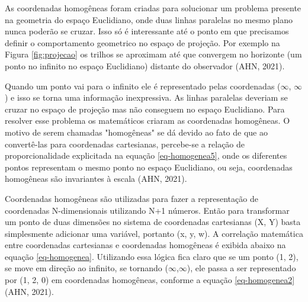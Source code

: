 \label{ap:coordenadas-homogeneas}

As coordenadas homogêneas foram criadas para solucionar um problema presente na geometria do espaço Euclidiano, onde duas linhas paralelas no mesmo plano nunca poderão se cruzar. Isso só é interessante até o ponto em que precisamos definir o comportamento geometrico no espaço de projeção. Por exemplo na Figura \ref{fig:projecao} os trilhos se aproximam até que convergem no horizonte (um ponto no infinito no espaço Euclidiano) distante do observador (AHN, 2021)\nocite{homogenous}.

	\begin{figure}[h!]
		\centering
	\end{figure}

Quando um ponto vai para o infinito ele é representado pelas coordenadas ($\infty$, $\infty$) e isso se torna uma informação inexpressiva. As linhas paralelas deveriam se cruzar no espaço de projeção mas não conseguem no espaço Euclidiano. Para resolver esse problema os matemáticos criaram as coordenadas homogêneas. O motivo de serem chamadas "homogêneas" se dá devido ao fato de que ao convertê-las para coordenadas cartesianas, percebe-se a relação de proporcionalidade explicitada na equação \ref{eq-homogenea5}, onde os diferentes pontos representam o mesmo ponto no espaço Euclidiano, ou seja, coordenadas homogêneas são invariantes à escala (AHN, 2021).

Coordenadas homogêneas são utilizadas para fazer a representação de coordenadas N-dimensionais utilizando N+1 números. Então para transformar um ponto de duas dimensões no sistema de coordenadas cartesianas (X, Y) basta simplesmente adicionar uma variável, portanto (x, y, w). A correlação matemática entre coordenadas cartesianas e coordenadas homogêneas é exibida abaixo na equação \ref{eq-homogenea}. Utilizando essa lógica fica claro que se um ponto (1, 2), se move em direção ao infinito, se tornando ($\infty$,$\infty$), ele passa a ser representado por (1, 2, 0) em coordenadas homogêneas, conforme a equação \ref{eq-homogenea2} (AHN, 2021).

